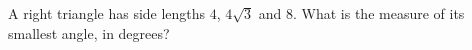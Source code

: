 A right triangle has side lengths $4$, $4\sqrt3$ and $8$. What is the measure of its smallest angle, in degrees?
